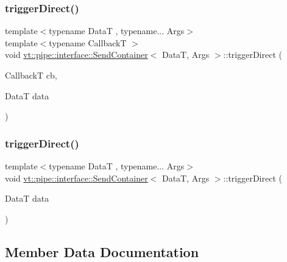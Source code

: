\subsubsection{\texorpdfstring{trigger\+Direct()}{triggerDirect()}\hspace{0.1cm}{\footnotesize\ttfamily [1/2]}}
{\footnotesize\ttfamily template$<$typename DataT , typename... Args$>$ \\
template$<$typename CallbackT $>$ \\
void \hyperlink{structvt_1_1pipe_1_1interface_1_1_send_container}{vt\+::pipe\+::interface\+::\+Send\+Container}$<$ DataT, Args $>$\+::trigger\+Direct (\begin{DoxyParamCaption}\item[{CallbackT}]{cb,  }\item[{DataT}]{data }\end{DoxyParamCaption})\hspace{0.3cm}{\ttfamily [private]}}

\mbox{\label{structvt_1_1pipe_1_1interface_1_1_send_container_a6c504af8cd8a553fe059045660786803}} 
\subsubsection{\texorpdfstring{trigger\+Direct()}{triggerDirect()}\hspace{0.1cm}{\footnotesize\ttfamily [2/2]}}
{\footnotesize\ttfamily template$<$typename DataT , typename... Args$>$ \\
void \hyperlink{structvt_1_1pipe_1_1interface_1_1_send_container}{vt\+::pipe\+::interface\+::\+Send\+Container}$<$ DataT, Args $>$\+::trigger\+Direct (\begin{DoxyParamCaption}\item[{DataT}]{data }\end{DoxyParamCaption})\hspace{0.3cm}{\ttfamily [private]}}



\subsection{Member Data Documentation}
\mbox{\label{structvt_1_1pipe_1_1interface_1_1_send_container_ae4531eb2c073b81891360f98a7dc72c6}} 
